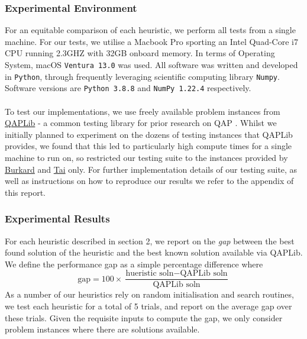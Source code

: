 \documentclass[a4paper,10pt]{article}
\begin{document}
\subsubsection*{Experimental Environment}
For an equitable comparison of each heuristic, we perform all tests from a single machine. For our tests, we utilise a Macbook Pro sporting an Intel Quad-Core i7 CPU running 2.3GHZ with 32GB onboard memory. In terms of Operating System, macOS \texttt{Ventura 13.0} was used. All software was written and developed in \texttt{Python}, through frequently leveraging scientific computing library \texttt{Numpy}. Software versions are \texttt{Python 3.8.8} and \texttt{NumPy 1.22.4} respectively. \\
\\
To test our implementations, we use freely available problem instances from \href{https://coral.ise.lehigh.edu/data-sets/qaplib/}{QAPLib} - a common testing library for prior research on QAP \cite{JUNGER2001283, 1994Improved, stuzle}. Whilst we initially planned to experiment on the dozens of testing instances that QAPLib provides, we found that this led to particularly high compute times for a single machine to run on, so restricted our testing suite to the instances provided by \href{https://qaplib.mgi.polymtl.ca/#BO}{Burkard} and \href{https://qaplib.mgi.polymtl.ca/#Ta}{Tai} only. For further implementation details of our testing suite, as well as instructions on how to reproduce our results we refer to the appendix of this report.

\subsubsection*{Experimental Results}
For each heuristic described in section 2, we report on the \textit{gap} between the best found solution of the heuristic and the best known solution available via QAPLib.  We define the performance gap as a simple percentage difference where 
$$\text{gap} = 100 \times \frac{\text{hueristic soln} - \text{QAPLib  soln}}{\text{QAPLib soln}}$$
As a number of our heuristics rely on random initialisation and search routines, we test each heuristic for a total of 5 trials, and report on the average gap over these trials. Given the requisite inputs to compute the gap, we only consider problem instances where there are solutions available.
\end{document}
